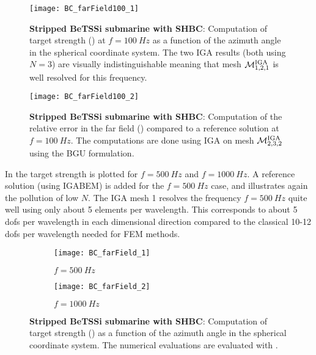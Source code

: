\begin{figure}
	\centering    
	\texttt{[image: BC\_farField100\_1]}
	\caption{\textbf{Stripped BeTSSi submarine with SHBC}: Computation of target strength () at $f=\SI{100}{Hz}$ as a function of the azimuth angle in the spherical coordinate system. The two IGA results (both using $N=3$) are visually indistinguishable meaning that mesh ${\cal M}_{1,2,1}^{\mathrm{IGA}}$ is well resolved for this frequency.}
	\label{Fig2:FarField100}
\end{figure}
\begin{figure}
	\centering    
	\texttt{[image: BC\_farField100\_2]}
	\caption{\textbf{Stripped BeTSSi submarine with SHBC}: Computation of the relative error in the far field () compared to a reference solution at $f=\SI{100}{Hz}$. The computations are done using IGA on mesh ${\cal M}_{2,3,2}^{\mathrm{IGA}}$ using the BGU formulation.}
	\label{Fig2:FarField100error}
\end{figure}
In  the target strength is plotted for $f=\SI{500}{Hz}$ and $f=\SI{1000}{Hz}$. A reference solution (using IGABEM) is added for the $f=\SI{500}{Hz}$ case, and illustrates again the pollution of low $N$. The IGA mesh 1 resolves the frequency $f=\SI{500}{Hz}$ quite well using only about 5 elements per wavelength. This corresponds to about 5 dofs per wavelength in each dimensional direction compared to the classical 10-12 dofs per wavelength needed for FEM methods.
\begin{figure}
	\centering    
	\begin{subfigure}[b]{\textwidth}
		\centering
		\texttt{[image: BC\_farField\_1]}
		\caption{$f=\SI{500}{Hz}$}
	\end{subfigure}
	\par\bigskip
	\par\bigskip
	\begin{subfigure}[b]{\textwidth}
		\centering
		\texttt{[image: BC\_farField\_2]}
		\caption{$f=\SI{1000}{Hz}$}
	\end{subfigure}
	\caption{\textbf{Stripped BeTSSi submarine with SHBC}: Computation of target strength () as a function of the azimuth angle in the spherical coordinate system. The numerical evaluations are evaluated with .}
	\label{Fig2:FarField}
\end{figure}
